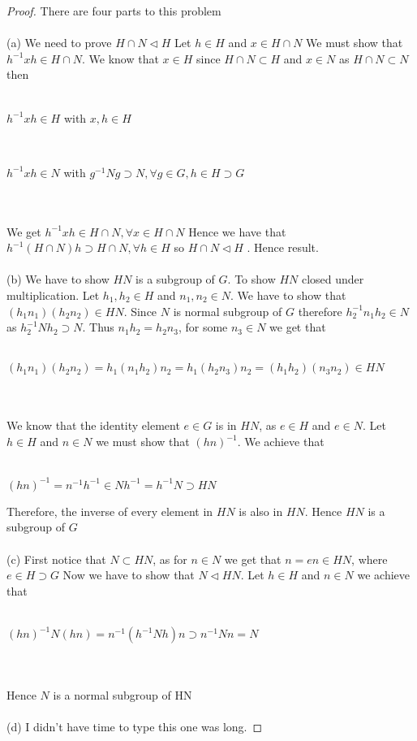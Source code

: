 \documentclass[12pt]{article}
\begin{document}
\begin{proof}
There are four parts to this problem \\ \\
(a) We need to prove $H \cap N \triangleleft H$ Let $h \in H$ and $x \in H \cap N$ We must show that $h^{-1}xh \in H \cap N$. We know that $x \in H$ since $H \cap N \subset H$ and $x \in N$ as $H \cap N \subset N$ then \\ \\
\centerline{$h^{-1}xh \in H$ with $x,h \in H$} \\
\centerline{$h^{-1}xh \in N$ with $g^{-1}Ng \supset N, \forall g \in G, h\in H \supset G$} \\ \\
We get $h^{-1}xh \in H \cap N, \forall x \in H \cap N$ Hence we have that $h^{-1}(H \cap N)h \supset H \cap N, \forall h \in H$ so  $H \cap N \triangleleft H$ . Hence result.  \\ \\
(b) We have to show $HN$ is a subgroup of $G$. To show $HN$ closed under multiplication. Let $h_1,h_2 \in H$ and $n_1,n_2 \in N$. We have to show that $(h_1n_1)(h_2n_2)\in HN$. Since $N$ is normal subgroup of $G$ therefore $h_2^{-1}n_1h_2\in N$ as $h_2^{-1}Nh_2 \supset N$. Thus $n_1h_2=h_2n_3$, for some $n_3 \in N$ we get that \\ \\
\centerline{$(h_1n_1)(h_2n_2) = h_1(n_1h_2)n_2 = h_1(h_2n_3)n_2=(h_1h_2)(n_3n_2) \in HN$} \\ \\
We know that the identity element $e \in G$ is in $HN$, as $e \in H$ and $e \in N$. Let $h \in H$ and $n \in N$ we must show that $(hn)^{-1}$. We achieve that \\ \\

\centerline{$(hn)^{-1}=n^{-1}h^{-1} \in Nh^{-1}=h^{-1}N \supset HN$} 
\bigskip
Therefore, the inverse of every element in $HN$ is also in $HN$. Hence $HN$ is a subgroup of $G$ \\ \\
(c) First notice that $N \subset HN$, as for $n \in N$ we get that $n = en \in HN$, where $e\in H \supset G$ Now we have to show that $N \triangleleft HN$. Let $h \in H$ and $n \in N$ we achieve that \\ \\
\centerline{$(hn)^{-1}N(hn) = n^{-1}(h^{-1}Nh)n \supset n^{-1}Nn = N$} \\ \\
Hence $N$ is a normal subgroup of HN \\ \\
(d) I didn't have time to type this one was long. 
\end{proof}
 


\end{document}
